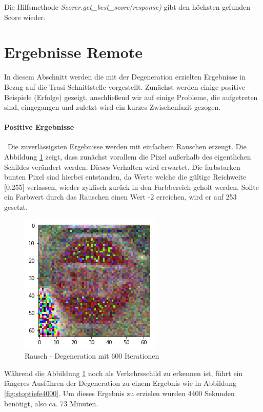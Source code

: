Die Hilfsmethode \textit{Scorer.get\_best\_score(response)} gibt den höchsten gefunden Score wieder.
\newpage
\begin{scriptsize}
\end{scriptsize}
\newpage
\section{Ergebnisse Remote}
\label{sec:DegenerationErgebnisse}
In diesem Abschnitt werden die mit der Degeneration erzielten Ergebnisse in Bezug auf die Trasi-Schnittstelle vorgestellt. Zunächst werden einige positive Beispiele (Erfolge) gezeigt, anschließend wir auf einige Probleme, die aufgetreten sind, eingegangen und zuletzt wird ein kurzes Zwischenfazit gezogen. 
\paragraph{Positive Ergebnisse} ~\newline Die zuverlässigsten Ergebnisse werden mit einfachem Rauschen erzeugt. Die Abbildung \ref{fig:stoptiefe600} zeigt, dass zunächst vorallem die Pixel außerhalb des eigentlichen Schildes verändert werden. Dieses Verhalten wird erwartet. Die farbstarken bunten Pixel sind hierbei entstanden, da Werte welche die gültige Reichweite [0,255] verlassen, wieder zyklisch zurück in den Farbbereich geholt werden. Sollte ein Farbwert durch das Rauschen einen Wert -2 erreichen, wird er auf 253 gesetzt.  

\begin{figure}[h]
	\centering
	\includegraphics[width=0.4\linewidth]{Images/DegenSamples/StopTiefe600}
	\caption[Degeneration Tiefe 600]{Rausch - Degeneration mit 600 Iterationen}
	\label{fig:stoptiefe600}
\end{figure}

Während die Abbildung \ref{fig:stoptiefe600} noch als Verkehrsschild zu erkennen ist, führt ein längeres Ausführen der Degeneration zu einem Ergebnis wie in Abbildung \ref{fig:stoptiefe4000}. Um dieses Ergebnis zu erzielen wurden 4400 Sekunden benötigt, also ca. 73 Minuten.

